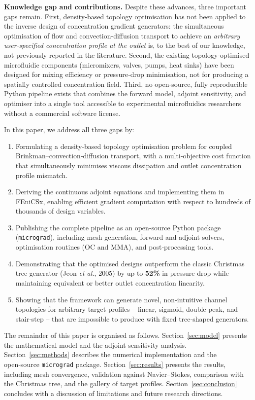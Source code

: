 \documentclass[12pt]{article}
\begin{document}
\textbf{Knowledge gap and contributions.} Despite these advances, three important gaps remain. First, density‑based topology optimisation has not been applied to the inverse design of concentration gradient generators: the simultaneous optimisation of flow and convection‑diffusion transport to achieve an \textit{arbitrary user‑specified concentration profile at the outlet} is, to the best of our knowledge, not previously reported in the literature. Second, the existing topology‑optimised microfluidic components (micromixers, valves, pumps, heat sinks) have been designed for mixing efficiency or pressure‑drop minimisation, not for producing a spatially controlled concentration field. Third, no open‑source, fully reproducible Python pipeline exists that combines the forward model, adjoint sensitivity, and optimiser into a single tool accessible to experimental microfluidics researchers without a commercial software license.

In this paper, we address all three gaps by:
\begin{enumerate}
    \item Formulating a density‑based topology optimisation problem for coupled Brinkman–convection‑diffusion transport, with a multi‑objective cost function that simultaneously minimises viscous dissipation and outlet concentration profile mismatch.
    \item Deriving the continuous adjoint equations and implementing them in FEniCSx, enabling efficient gradient computation with respect to hundreds of thousands of design variables.
    \item Publishing the complete pipeline as an open‑source Python package (\texttt{micrograd}), including mesh generation, forward and adjoint solvers, optimisation routines (OC and MMA), and post‑processing tools.
    \item Demonstrating that the optimised designs outperform the classic Christmas tree generator (Jeon \textit{et al.}, 2005) by up to \textbf{52\%} in pressure drop while maintaining equivalent or better outlet concentration linearity.
    \item Showing that the framework can generate novel, non‑intuitive channel topologies for arbitrary target profiles – linear, sigmoid, double‑peak, and stair‑step – that are impossible to produce with fixed tree‑shaped generators.
\end{enumerate}

The remainder of this paper is organised as follows. Section~\ref{sec:model} presents the mathematical model and the adjoint sensitivity analysis. Section~\ref{sec:methods} describes the numerical implementation and the open‑source \texttt{micrograd} package. Section~\ref{sec:results} presents the results, including mesh convergence, validation against Navier–Stokes, comparison with the Christmas tree, and the gallery of target profiles. Section~\ref{sec:conclusion} concludes with a discussion of limitations and future research directions.
\end{document}
